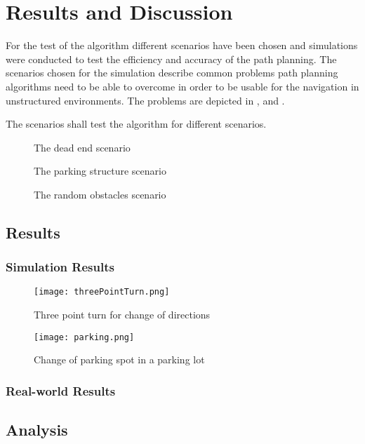\chapter{Results and Discussion}
For the test of the algorithm different scenarios have been chosen and simulations were conducted to test the efficiency and accuracy of the path planning. The scenarios chosen for the simulation describe common problems path planning algorithms need to be able to overcome in order to be usable for the navigation in unstructured environments. The problems are depicted in ,  and .

The scenarios shall test the algorithm for different scenarios.

\begin{figure}[h]
    \caption{The dead end scenario}
    \label{fig:scenarioDeadEnd}
\end{figure}

\begin{figure}[h]
    \caption{The parking structure scenario}
    \label{fig:scenarioParkingStructure}
\end{figure}

\begin{figure}[h]
    \caption{The random obstacles scenario}
    \label{fig:scenarioRandomObstacles}
\end{figure}

\section{Results}

\subsection{Simulation Results}

\begin{figure}[h]
    \texttt{[image: threePointTurn.png]}
    \caption{Three point turn for change of directions}
    \label{fig:threePointTurn}
\end{figure}

\begin{figure}[h]
    \texttt{[image: parking.png]}
    \caption{Change of parking spot in a parking lot}
    \label{fig:parking}
\end{figure}

\subsection{Real-world Results}

\section{Analysis}